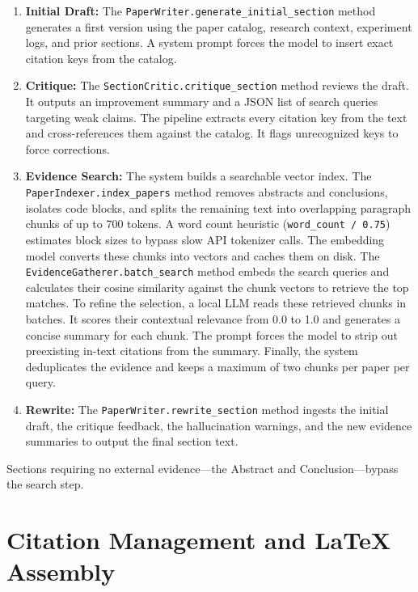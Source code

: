 \begin{enumerate}[nosep]
	\item \textbf{Initial Draft:} The \texttt{PaperWriter.generate\_initial\_section} method generates a first version using the paper catalog, research context, experiment logs, and prior sections.
	A system prompt forces the model to insert exact citation keys from the catalog.
	\item \textbf{Critique:} The \texttt{SectionCritic.critique\_section} method reviews the draft.
	It outputs an improvement summary and a JSON list of search queries targeting weak claims.
	The pipeline extracts every citation key from the text and cross-references them against the catalog.
	It flags unrecognized keys to force corrections.
	\item \textbf{Evidence Search:} The system builds a searchable vector index.
	The \texttt{PaperIndexer.\allowbreak{}index\_\allowbreak{}papers} method removes abstracts and conclusions, isolates code blocks, and splits the remaining text into overlapping paragraph chunks of up to 700 tokens.
	A word count heuristic (\texttt{word\_count / 0.75}) estimates block sizes to bypass slow API tokenizer calls.
	The embedding model converts these chunks into vectors and caches them on disk.
	The \texttt{EvidenceGatherer.batch\_search} method embeds the search queries and calculates their cosine similarity against the chunk vectors to retrieve the top matches.
	To refine the selection, a local LLM reads these retrieved chunks in batches.
	It scores their contextual relevance from 0.0 to 1.0 and generates a concise summary for each chunk.
	The prompt forces the model to strip out preexisting in-text citations from the summary.
	Finally, the system deduplicates the evidence and keeps a maximum of two chunks per paper per query.
	\item \textbf{Rewrite:} The \texttt{PaperWriter.rewrite\_section} method ingests the initial draft, the critique feedback, the hallucination warnings, and the new evidence summaries to output the final section text.
\end{enumerate}

Sections requiring no external evidence---the Abstract and Conclusion---bypass the search step.




\section{Citation Management and \LaTeX{} Assembly}

